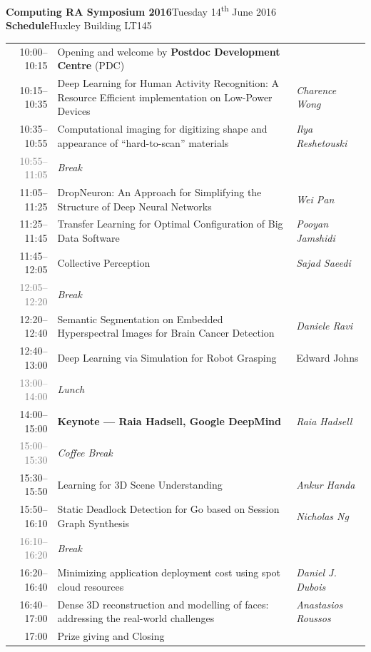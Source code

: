 \documentclass[11pt]{article}
\begin{document}
\textbf{\flushleft\Huge Computing RA Symposium 2016}\hfill{}Tuesday 14\textsuperscript{th} June 2016\\
\textbf{\flushleft\LARGE\color{icdarkblue}Schedule}\hfill{}Huxley Building LT145\\[0.5cm]

\renewcommand{\arraystretch}{1.2}
\begin{tabular}{r@{\quad\color{icdarkblue}{\vline}\quad}p{10cm}@{\quad\color{iclightblue}{\vline}\quad}l}
  10:00--10:15
  & Opening and welcome by \textbf{Postdoc Development Centre} (PDC)
  & \\
  10:15--10:35
  & Deep Learning for Human Activity Recognition: A Resource Efficient implementation on Low-Power Devices
  & \textit{Charence Wong}
  \\
  10:35--10:55
  & Computational imaging for digitizing shape and appearance of ``hard-to-scan'' materials
  & \textit{Ilya Reshetouski}
  \\[0.8cm]
  \textcolor{gray}{10:55--11:05}
  & \textit{\color{gray}Break}
  & \\[0.3cm]
  11:05--11:25
  & DropNeuron: An Approach for Simplifying the Structure of Deep Neural Networks
  & \textit{Wei Pan}\\
  11:25--11:45
  & Transfer Learning for Optimal Configuration of Big Data Software
  & \textit{Pooyan Jamshidi}\\
  11:45--12:05
  & Collective Perception
  & \textit{Sajad Saeedi}\\[0.3cm]
  \textcolor{gray}{12:05--12:20}
  & \textit{\color{gray}Break}
  & \\[0.3cm]
  12:20--12:40
  & Semantic Segmentation on Embedded Hyperspectral Images for Brain Cancer Detection
  & \textit{Daniele Ravi}\\
  12:40--13:00
  & Deep Learning via Simulation for Robot Grasping
  & Edward Johns\\[0.3cm]
  \textcolor{gray}{13:00--14:00}
  & \textit{\color{gray}Lunch}
  & \\[0.3cm]
  14:00--15:00
  & {\large\bf Keynote --- Raia Hadsell, Google DeepMind}
  & \textit{Raia Hadsell}\\
  \textcolor{gray}{15:00--15:30}
  & \textit{\color{gray}Coffee Break}
  & \\[0.3cm]
  15:30--15:50
  & Learning for 3D Scene Understanding
  & \textit{Ankur Handa}\\
  15:50--16:10
  & Static Deadlock Detection for Go based on Session Graph Synthesis
  & \textit{Nicholas Ng}\\[0.8cm]
  \textcolor{gray}{16:10--16:20}
  & \textit{\color{gray}Break}
  & \\[0.3cm]
  16:20--16:40
  & Minimizing application deployment cost using spot cloud resources
  & \textit{Daniel J. Dubois}\\
  16:40--17:00
  & Dense 3D reconstruction and modelling of faces: addressing the real-world challenges
  & \textit{Anastasios Roussos}\\[0.8cm]
  17:00
  & Prize giving and Closing
  & \\
\end{tabular}
\end{document}
